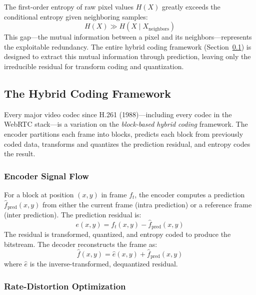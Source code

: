 The first-order entropy of raw pixel values $H(X)$ greatly exceeds the
conditional entropy given neighboring samples:
\begin{equation}
  H(X) \gg H(X \mid X_{\text{neighbors}})
  \label{eq:conditional-entropy}
\end{equation}
This gap---the mutual information between a pixel and its
neighbors---represents the exploitable redundancy. The entire hybrid coding
framework (Section~\ref{sec:hybrid}) is designed to extract this mutual
information through prediction, leaving only the irreducible residual for
transform coding and quantization.

\subsection{The Hybrid Coding Framework}
\label{sec:hybrid}

Every major video codec since H.261 (1988)---including every codec in the
WebRTC stack---is a variation on the \emph{block-based hybrid coding}
framework. The encoder partitions each frame into blocks, predicts each block
from previously coded data, transforms and quantizes the prediction residual,
and entropy codes the result.

\subsubsection{Encoder Signal Flow}

For a block at position $(x,y)$ in frame $f_t$, the encoder computes a
prediction $\hat{f}_{\text{pred}}(x,y)$ from either the current frame
(intra prediction) or a reference frame (inter prediction). The prediction
residual is:
\begin{equation}
  e(x,y) = f_t(x,y) - \hat{f}_{\text{pred}}(x,y)
  \label{eq:residual}
\end{equation}
The residual is transformed, quantized, and entropy coded to produce the
bitstream. The decoder reconstructs the frame as:
\begin{equation}
  \hat{f}(x,y) = \hat{e}(x,y) + \hat{f}_{\text{pred}}(x,y)
  \label{eq:reconstruction}
\end{equation}
where $\hat{e}$ is the inverse-transformed, dequantized residual.

\subsubsection{Rate-Distortion Optimization}

